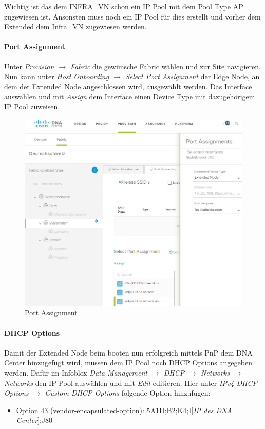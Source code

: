 Wichtig ist das dem INFRA\_VN schon ein IP Pool mit dem Pool Type AP zugewiesen ist. Ansonsten muss noch ein IP Pool für dies erstellt und vorher dem Extended dem Infra\_VN zugewiesen werden.

\paragraph{Port Assignment}
Unter \textit{Provision $\rightarrow$ Fabric} die gewünsche Fabric wählen und zur Site navigieren. Nun kann unter \textit{Host Onboarding $\rightarrow$ Select Port Assignment} der Edge Node, an dem der Extended Node angeschlossen wird, ausgewählt werden. Das Interface auswählen und mit \textit{Assign} dem Interface einen Device Type mit dazugehörigem IP Pool zuweisen.

\begin{figure}[H]
	\centering
	\includegraphics[width=1\linewidth]{img/Absicherung/ExtendedNode3}
	\caption{Port Assignment}
	\label{fig:Port Assignment}
\end{figure}

\paragraph{DHCP Options}
Damit der Extended Node beim booten nun erfolgreich mittels PnP dem DNA Center hinzugefügt wird, müssen dem IP Pool noch DHCP Options angegeben werden. Dafür im Infoblox \textit{Data Management $\rightarrow$ DHCP $\rightarrow$ Networks $\rightarrow$ Networks} den IP Pool auswählen und mit \textit{Edit} editieren. Hier unter \textit{IPv4 DHCP Options $\rightarrow$ Custom DHCP Options} folgende Option hinzufügen:
\begin{itemize}
	\item Option 43 (vendor-encapsulated-option): 5A1D;B2;K4;I[\textit{IP des DNA Center}];J80
\end{itemize}

